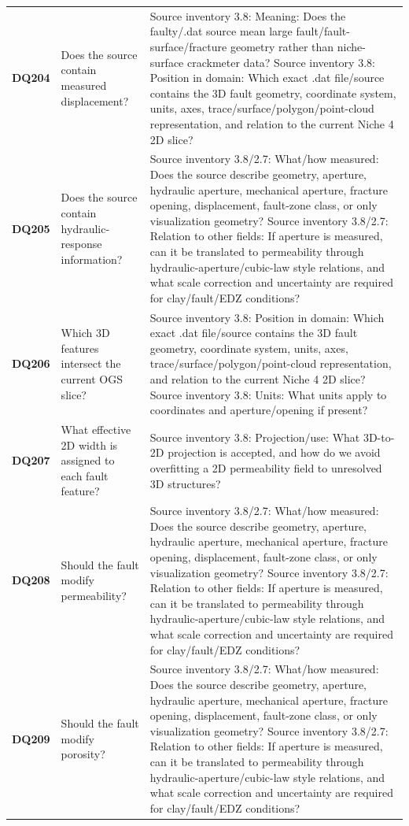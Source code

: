 \begin{longtable}{@{}L{0.09\textwidth} L{0.31\textwidth} L{0.52\textwidth}@{}}
\addlinespace[0.18em]
\textbf{DQ204} & Does the source contain measured displacement? & Source inventory 3.8: Meaning: Does the faulty/.dat source mean large fault/fault-surface/fracture geometry rather than niche-surface crackmeter data? Source inventory 3.8: Position in domain: Which exact .dat file/source contains the 3D fault geometry, coordinate system, units, axes, trace/surface/polygon/point-cloud representation, and relation to the current Niche 4 2D slice?\\
\addlinespace[0.18em]
\textbf{DQ205} & Does the source contain hydraulic-response information? & Source inventory 3.8/2.7: What/how measured: Does the source describe geometry, aperture, hydraulic aperture, mechanical aperture, fracture opening, displacement, fault-zone class, or only visualization geometry? Source inventory 3.8/2.7: Relation to other fields: If aperture is measured, can it be translated to permeability through hydraulic-aperture/cubic-law style relations, and what scale correction and uncertainty are required for clay/fault/EDZ conditions?\\
\addlinespace[0.18em]
\textbf{DQ206} & Which 3D features intersect the current OGS slice? & Source inventory 3.8: Position in domain: Which exact .dat file/source contains the 3D fault geometry, coordinate system, units, axes, trace/surface/polygon/point-cloud representation, and relation to the current Niche 4 2D slice? Source inventory 3.8: Units: What units apply to coordinates and aperture/opening if present?\\
\addlinespace[0.18em]
\textbf{DQ207} & What effective 2D width is assigned to each fault feature? & Source inventory 3.8: Projection/use: What 3D-to-2D projection is accepted, and how do we avoid overfitting a 2D permeability field to unresolved 3D structures?\\
\addlinespace[0.18em]
\textbf{DQ208} & Should the fault modify permeability? & Source inventory 3.8/2.7: What/how measured: Does the source describe geometry, aperture, hydraulic aperture, mechanical aperture, fracture opening, displacement, fault-zone class, or only visualization geometry? Source inventory 3.8/2.7: Relation to other fields: If aperture is measured, can it be translated to permeability through hydraulic-aperture/cubic-law style relations, and what scale correction and uncertainty are required for clay/fault/EDZ conditions?\\
\addlinespace[0.18em]
\textbf{DQ209} & Should the fault modify porosity? & Source inventory 3.8/2.7: What/how measured: Does the source describe geometry, aperture, hydraulic aperture, mechanical aperture, fracture opening, displacement, fault-zone class, or only visualization geometry? Source inventory 3.8/2.7: Relation to other fields: If aperture is measured, can it be translated to permeability through hydraulic-aperture/cubic-law style relations, and what scale correction and uncertainty are required for clay/fault/EDZ conditions?\\

\end{longtable}
